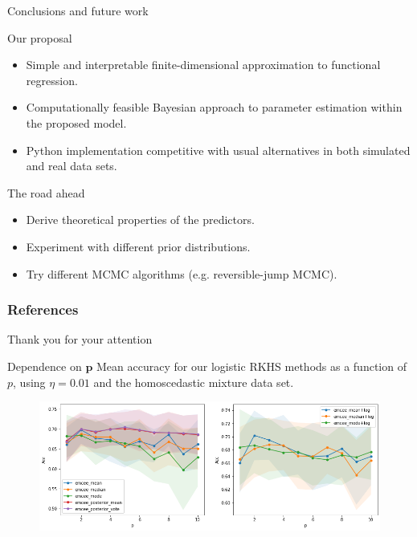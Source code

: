 \documentclass[9pt, english, professionalfonts]{beamer}
\begin{document}
\begin{frame}{Conclusions and future work}

 \begin{alertblock}{Our proposal}
   \begin{itemize}
     \item Simple and interpretable finite-dimensional approximation to functional regression.
     \item Computationally feasible Bayesian approach to parameter estimation within the proposed model.
     \item Python implementation competitive with usual alternatives in both simulated and real data sets.
   \end{itemize}
 \end{alertblock}

\pause

 \begin{exampleblock}{The road ahead}
   \begin{itemize}
     \item Derive theoretical properties of the predictors.
     \item Experiment with different prior distributions.
     \item Try different MCMC algorithms (e.g. reversible-jump MCMC).
   \end{itemize}
 \end{exampleblock}

\end{frame}

\begin{frame}
    \frametitle{References}
    \nocite{*}
    \printbibliography[heading=none]
\end{frame}

\appendix

\begin{frame}[standout]
  Thank you for your attention
\end{frame}




\begin{frame}{Dependence on \(\bm p\)}
Mean accuracy for our logistic RKHS methods as a function of \(p\), using \(\eta=0.01\) and the homoscedastic mixture data set.

\vspace{1em}

\begin{figure}
  \centering
  \includegraphics[width=.95\textwidth]{mixture_dependence_acc_p}
  \caption*{}
\end{figure}
\end{frame}
\end{document}
